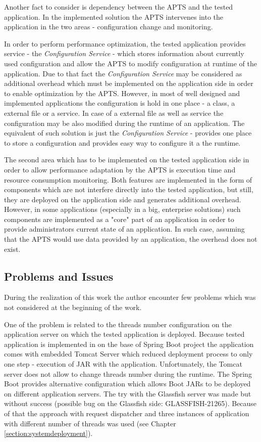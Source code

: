 \documentclass[12pt,a4paper]{article}
\begin{document}
Another fact to consider is dependency between the APTS and the tested application. In the implemented solution the APTS intervenes into the application in the two areas - configuration change and monitoring. 

In order to perform performance optimization, the tested application provides service - the \textit{Configuration Service} - which stores information about currently used configuration and allow the APTS to modify configuration at runtime of the application. Due to that fact the \textit{Configuration Service} may be considered as additional overhead which must be implemented on the application side in order to enable optimization by the APTS. However, in most of well designed and implemented applications the configuration is hold in one place - a class, a external file or a service. In case of a external file as well as service the configuration may be also modified during the runtime of an application. The equivalent of such solution is just the \textit{Configuration Service} - provides one place to store a configuration and provides easy way to configure it a the runtime.  

The second area which has to be implemented on the tested application side in order to allow performance adaptation by the APTS is execution time and resource consumption monitoring. Both features are implemented in the form of components which are not interfere directly into the tested application, but still, they are deployed on the application side and generates additional overhead. However, in some applications (especially in a big, enterprise solutions) such components are implemented as a "core" part of an application in order to provide administrators current state of an application. In such case, assuming that the APTS would use data provided by an application, the overhead does not exist. 



\subsection{Problems and Issues}

During the realization of this work the author encounter few problems which was not considered at the beginning of the work.

One of the problem is related to the threads number configuration on the application server on which the tested application is deployed. Because tested application is implemented in on the base of Spring Boot project the application comes with embedded Tomcat Server which reduced deployment process to only one step - execution of JAR with the application. Unfortunately, the Tomcat server does not allow to change threads number during the runtime. The Spring Boot provides alternative configuration which allows Boot JARs to be deployed on different application servers. The try with the Glassfish server was made but without success (possible bug on the Glassfish side: GLASSFISH-21265).  Because of that the approach with request dispatcher and three instances of application with different number of threads was used (see Chapter \ref{section:systemdeployment}). 
\end{document}
